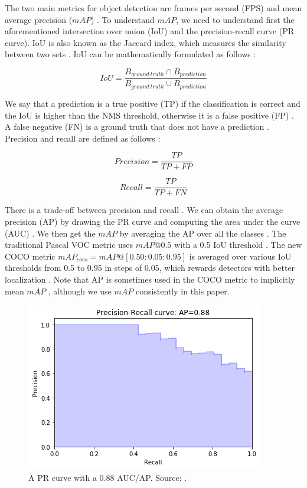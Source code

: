 \documentclass[a4paper, 11pt, oneside]{article}
\begin{document}
The two main metrics for object detection are frames per second (FPS) and mean average precision ($mAP$)
\cite{elgendy2020deep, liu2020deep, geron2019hands, planche2019hands}. To understand $mAP$, we need to understand first
the aforementioned intersection over union (IoU) and the precision-recall curve (PR curve). IoU is also known as
the Jaccard index, which measures the similarity between two sets \cite{planche2019hands}. IoU can be mathematically
formulated as follows \cite{elgendy2020deep, planche2019hands}:

$$IoU = \frac{B_{ground \ truth} \cap B_{prediction}}{B_{ground \ truth} \cup B_{prediction}}$$

We say that a prediction is a true positive (TP) if the classification is correct and the IoU is higher than the NMS
threshold, otherwise it is a false positive (FP) \cite{elgendy2020deep, liu2020deep, planche2019hands}. A false negative
(FN) is a ground truth that does not have a prediction \cite{planche2019hands}. Precision and recall are defined as
follows \cite{burkov2019hundred, davis2006relationship}:

$$Precision = \frac{TP}{TP + FP}$$

$$Recall = \frac{TP}{TP + FN}$$

There is a trade-off between precision and recall
\cite{elgendy2020deep, geron2019hands, burkov2019hundred, planche2019hands}. We can obtain the average precision
(AP) by drawing the PR curve and computing the area under the curve (AUC) \cite{elgendy2020deep, planche2019hands}.
We then get the $mAP$ by averaging the AP over all the classes \cite{elgendy2020deep, geron2019hands, planche2019hands}.
The traditional Pascal VOC metric uses $mAP@0.5$ with a 0.5 IoU threshold \cite{liu2020deep, everingham2010pascal}.
The new COCO metric $mAP_{coco} = mAP@[0.50:0.05:0.95]$ is averaged over
various IoU thresholds from 0.5 to 0.95 in steps of 0.05, which rewards detectors with better localization
\cite{liu2020deep, cocometrics}. Note that AP is sometimes used in the COCO metric to implicitly mean $mAP$
\cite{cocometrics}, although we use $mAP$ consistently in this paper.

\begin{figure}[ht]
  \begin{center}
    \includegraphics[width=.5\textwidth]{pr_curve.png}
  \end{center}
  \caption{A PR curve with a 0.88 AUC/AP. Source: \cite{planche2019hands}.}
\end{figure}
\end{document}
